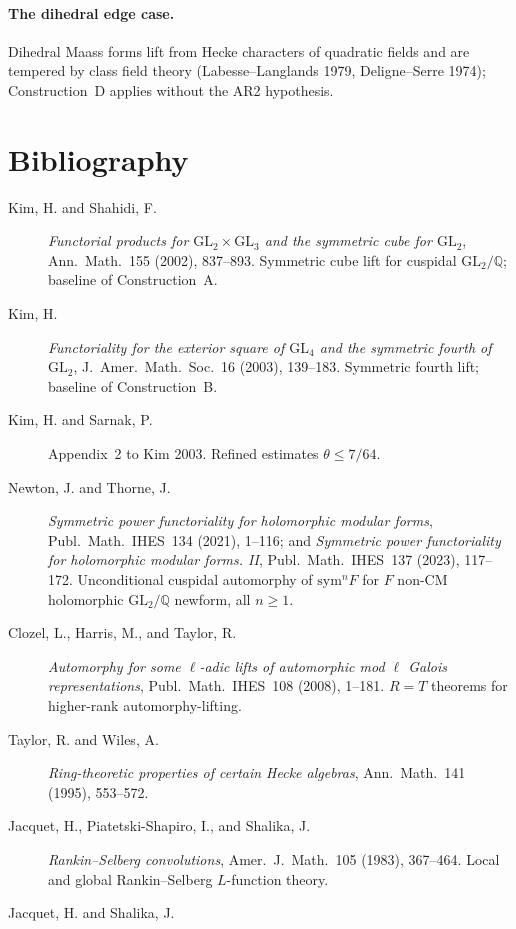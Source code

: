 \paragraph{The dihedral edge case.}
Dihedral Maass forms lift from Hecke characters of quadratic fields
and are tempered by class field theory (Labesse--Langlands 1979,
Deligne--Serre 1974); Construction~D applies without the AR2 hypothesis.

\section{Bibliography}
\label{v4-arith:w10-c:bibliography}

\begin{description}
\item[Kim, H. and Shahidi, F.]
\emph{Functorial products for \(\mathrm{GL}_{2}\times\mathrm{GL}_{3}\)
and the symmetric cube for \(\mathrm{GL}_{2}\)}, Ann.~Math.~155 (2002),
837--893. Symmetric cube lift for cuspidal
\(\mathrm{GL}_{2}/\mathbb{Q}\); baseline of Construction~A.
\item[Kim, H.]
\emph{Functoriality for the exterior square of \(\mathrm{GL}_{4}\) and
the symmetric fourth of \(\mathrm{GL}_{2}\)}, J.~Amer.~Math.~Soc.~16
(2003), 139--183. Symmetric fourth lift; baseline of Construction~B.
\item[Kim, H. and Sarnak, P.]
Appendix~2 to Kim 2003. Refined estimates \(\theta\leq 7/64\).
\item[Newton, J. and Thorne, J.]
\emph{Symmetric power functoriality for holomorphic modular forms},
Publ.~Math.~IHES~134 (2021), 1--116; and
\emph{Symmetric power functoriality for holomorphic modular forms.
II}, Publ.~Math.~IHES~137 (2023), 117--172. Unconditional cuspidal
automorphy of \(\mathrm{sym}^{n}F\) for \(F\) non-CM holomorphic
\(\mathrm{GL}_{2}/\mathbb{Q}\) newform, all \(n\geq 1\).
\item[Clozel, L., Harris, M., and Taylor, R.]
\emph{Automorphy for some \(\ell\)-adic lifts of automorphic mod \(\ell\)
Galois representations}, Publ.~Math.~IHES~108 (2008), 1--181.
\(R=T\) theorems for higher-rank automorphy-lifting.
\item[Taylor, R. and Wiles, A.]
\emph{Ring-theoretic properties of certain Hecke algebras},
Ann.~Math.~141 (1995), 553--572.
\item[Jacquet, H., Piatetski-Shapiro, I., and Shalika, J.]
\emph{Rankin--Selberg convolutions}, Amer.~J.~Math.~105 (1983),
367--464. Local and global Rankin--Selberg \(L\)-function theory.
\item[Jacquet, H. and Shalika, J.]

\end{description}
